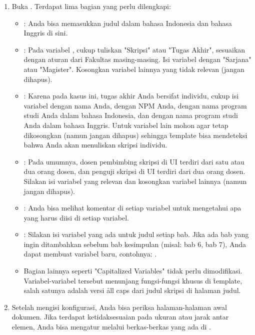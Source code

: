 \begin{enumerate}
	\item Buka . Terdapat lima bagian yang perlu dilengkapi:
	\begin{itemize}
		\item {}: Anda bisa memasukkan judul dalam bahasa Indonesia dan bahasa Inggris di sini.
		\item {}: Pada variabel , cukup tuliskan "Skripsi" atau "Tugas Akhir", sesuaikan dengan aturan dari Fakultas masing-masing.
		Isi variabel  dengan "Sarjana" atau "Magister". Kosongkan variabel lainnya yang tidak relevan (jangan dihapus).
		\item {}: Karena pada kasus ini, tugas akhir Anda bersifat individu, cukup isi variabel  dengan nama Anda,  dengan NPM Anda,  dengan nama program studi Anda dalam bahasa Indonesia, dan  dengan nama program studi Anda dalam bahasa Inggris.
		Untuk variabel lain mohon agar tetap dikosongkan (namun jangan dihapus) sehingga \f{template} bisa mendeteksi bahwa Anda akan menuliskan skripsi individu.
		\item {}: Pada umumnya, dosen pembimbing skripsi di UI terdiri dari satu atau dua orang dosen, dan penguji skripsi di UI terdiri dari dua orang dosen.
		Silakan isi variabel yang relevan dan kosongkan variabel lainnya (namun jangan dihapus).
		\item {}: Anda bisa melihat komentar di setiap variabel untuk mengetahui apa yang harus diisi di setiap variabel.
		\item {}: Silakan isi variabel yang ada untuk judul setiap bab. Jika ada bab yang ingin ditambahkan sebelum bab kesimpulan (misal: bab 6, bab 7), Anda dapat membuat variabel baru, contohnya: .
		\item Bagian lainnya seperti "Capitalized Variables" tidak perlu dimodifikasi. Variabel-variabel tersebut menunjang fungsi-fungsi khusus di \f{template}, salah satunya adalah versi \f{all caps} dari judul skripsi di halaman judul.
	\end{itemize}
	\item Setelah mengisi konfigurasi, Anda bisa periksa halaman-halaman awal dokumen.
	Jika terdapat ketidaksesuaian pada ukuran atau jarak antar elemen, Anda bisa mengatur melalui berkas-berkas yang ada di .

\end{enumerate}
